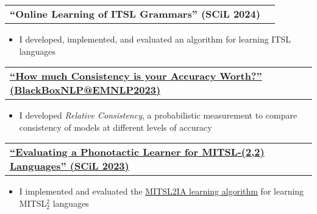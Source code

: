 \documentclass[letterpaper,11pt]{article}
\makeatletter
\newcommand{\resumeItem}[1]{
  \item{
    {#1 \vspace{-4pt}}
  }
}
\newcommand{\resumeSubheading}[4]{
  \vspace{-5pt}\item
    \begin{tabular*}{0.97\textwidth}[t]{l@{\extracolsep{\fill}}r}
      \textbf{#1} & #2 \\
    \end{tabular*}\vspace{-10pt}
}
\newcommand{\resumeItemListStart}{\begin{itemize}}
\newcommand{\resumeItemListEnd}{\end{itemize}\vspace{-5pt}}
\makeatother
\begin{document}
    \resumeSubheading
        {``Online Learning of ITSL Grammars'' (SCiL 2024)}{}{}{}
        \resumeItemListStart\small
            \resumeItem{I developed, implemented, and evaluated an algorithm for learning ITSL languages}
        \resumeItemListEnd

    \resumeSubheading
        {\href{https://aclanthology.org/2023.blackboxnlp-1.19/}{``How much Consistency is your Accuracy Worth?'' (BlackBoxNLP@EMNLP2023)}}{}{}{}
        \resumeItemListStart\small
            \resumeItem{I developed \textit{Relative Consistency}, a probabilistic measurement to compare consistency of models at different levels of accuracy}
        \resumeItemListEnd

    \resumeSubheading
        {\href{https://scholarworks.umass.edu/cgi/viewcontent.cgi?article=1268\&context=scil}{``Evaluating a Phonotactic Learner for MITSL-(2,2) Languages'' (SCiL 2023)}}{}{}{}
        \resumeItemListStart\small
            \resumeItem{I implemented and evaluated the \href{https://aclanthology.org/2021.scil-1.16.pdf}{MITSL2IA learning algorithm} for learning MITSL$_2^2$ languages}
        \resumeItemListEnd
\end{document}
